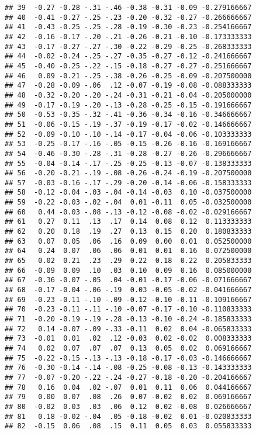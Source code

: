 \documentclass[]{article}
\begin{document}
\begin{verbatim}
## 39  -0.27 -0.28 -.31 -.46 -0.38 -0.31 -0.09 -0.279166667
## 40  -0.41 -0.27 -.25 -.23 -0.20 -0.32 -0.27 -0.266666667
## 41  -0.43 -0.25 -.25 -.28 -0.19 -0.30 -0.23 -0.254166667
## 42  -0.16 -0.17 -.20 -.21 -0.26 -0.21 -0.10 -0.173333333
## 43  -0.17 -0.27 -.27 -.30 -0.22 -0.29 -0.25 -0.268333333
## 44  -0.02 -0.24 -.25 -.27 -0.35 -0.27 -0.12 -0.241666667
## 45  -0.40 -0.25 -.22 -.15 -0.18 -0.27 -0.27 -0.251666667
## 46   0.09 -0.21 -.25 -.38 -0.26 -0.25 -0.09 -0.207500000
## 47  -0.28 -0.09 -.06  .12 -0.07 -0.19 -0.08 -0.088333333
## 48  -0.32 -0.20 -.20 -.24 -0.31 -0.21 -0.04 -0.205000000
## 49  -0.17 -0.19 -.20 -.13 -0.28 -0.25 -0.15 -0.191666667
## 50  -0.53 -0.35 -.32 -.41 -0.36 -0.34 -0.16 -0.346666667
## 51  -0.06 -0.15 -.19 -.37 -0.19 -0.17 -0.02 -0.146666667
## 52  -0.09 -0.10 -.10 -.14 -0.17 -0.04 -0.06 -0.103333333
## 53  -0.25 -0.17 -.16 -.05 -0.15 -0.26 -0.16 -0.169166667
## 54  -0.46 -0.30 -.28 -.31 -0.28 -0.27 -0.26 -0.296666667
## 55  -0.04 -0.14 -.17 -.25 -0.25 -0.13 -0.07 -0.138333333
## 56  -0.20 -0.21 -.19 -.08 -0.26 -0.24 -0.19 -0.207500000
## 57  -0.03 -0.16 -.17 -.29 -0.20 -0.14 -0.06 -0.158333333
## 58  -0.12 -0.04 -.03 -.04 -0.14 -0.03  0.10 -0.037500000
## 59  -0.22 -0.03 -.02 -.04  0.01 -0.11  0.05 -0.032500000
## 60   0.44 -0.03 -.08 -.13 -0.12 -0.08 -0.02 -0.029166667
## 61   0.27  0.11  .13  .17  0.14  0.08  0.12  0.113333333
## 62   0.20  0.18  .19  .27  0.13  0.15  0.20  0.180833333
## 63   0.07  0.05  .06  .16  0.09  0.00  0.01  0.052500000
## 64   0.24  0.07  .06  .06  0.01  0.01  0.16  0.072500000
## 65   0.02  0.21  .23  .29  0.22  0.18  0.22  0.205833333
## 66  -0.09  0.09  .10  .03  0.10  0.09  0.16  0.085000000
## 67  -0.36 -0.07 -.05  .04 -0.01 -0.17 -0.06 -0.071666667
## 68  -0.17 -0.04 -.06 -.19  0.03 -0.05 -0.02 -0.041666667
## 69  -0.23 -0.11 -.10 -.09 -0.12 -0.10 -0.11 -0.109166667
## 70  -0.23 -0.11 -.11 -.10 -0.07 -0.17 -0.10 -0.110833333
## 71  -0.20 -0.19 -.19 -.28 -0.13 -0.10 -0.24 -0.185833333
## 72   0.14 -0.07 -.09 -.33 -0.11  0.02  0.04 -0.065833333
## 73  -0.01  0.01  .02  .12 -0.03  0.02 -0.02  0.008333333
## 74   0.02  0.07  .07  .07  0.13  0.05  0.02  0.069166667
## 75  -0.22 -0.15 -.13 -.13 -0.18 -0.17 -0.03 -0.146666667
## 76  -0.30 -0.14 -.14 -.08 -0.25 -0.08 -0.13 -0.143333333
## 77  -0.07 -0.20 -.22 -.24 -0.27 -0.18 -0.20 -0.204166667
## 78   0.16  0.04  .02 -.07  0.01  0.11  0.06  0.044166667
## 79   0.00  0.07  .08  .26  0.07 -0.02  0.02  0.069166667
## 80  -0.02  0.03  .03  .06  0.12  0.02 -0.08  0.026666667
## 81   0.18 -0.02 -.04  .05 -0.18 -0.02  0.01 -0.020833333
## 82  -0.15  0.06  .08  .15  0.11  0.05  0.03  0.055833333

\end{verbatim}
\end{document}

